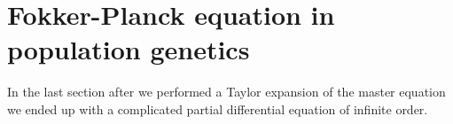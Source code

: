 \section{Fokker-Planck equation in population genetics}

In the last section after we performed a Taylor expansion of the master equation
we ended up with a complicated partial differential equation of infinite order.
